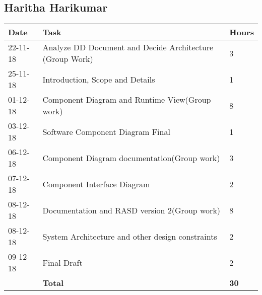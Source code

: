 \subsection{Haritha Harikumar}
\begin{table}[H]
	\centering
    \begin{tabular}{|l|l|l|}
    \hline
     \textbf{Date} & \textbf{Task} & \textbf{Hours}\\
    \hline
    22-11-18 & Analyze DD Document and Decide Architecture (Group Work) & 3 \\
    \hline
    25-11-18 & Introduction, Scope and Details & 1\\
    \hline
	01-12-18 &  Component Diagram and Runtime View(Group work) &  8\\
    \hline
    03-12-18 & Software Component Diagram Final & 1\\
    \hline
		06-12-18 & Component Diagram documentation(Group work) & 3\\
        \hline
        07-12-18 & Component Interface Diagram & 2\\
        \hline
		08-12-18 & Documentation and RASD version 2(Group work) & 8\\
        \hline
        08-12-18 & System Architecture and other design constraints & 2\\
        \hline
        09-12-18 & Final Draft & 2\\
    \hline
	& \textbf{Total}	& \textbf{30}\\   
    \hline
    \end{tabular}
\end{table}